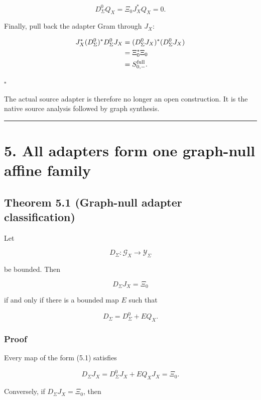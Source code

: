 \[
D_\Sigma^0Q_X
=
\Xi_0J_X^*Q_X
=
0.
\]

Finally, pull back the adapter Gram through \(J_X\):

\[
\begin{aligned}
J_X^*(D_\Sigma^0)^*D_\Sigma^0J_X
&=
(D_\Sigma^0J_X)^*(D_\Sigma^0J_X)\\
&=
\Xi_0^*\Xi_0\\
&=
S_{0,-}^{\rm full}.
\end{aligned}
\]

\(\square\)

The actual source adapter is therefore no longer an open construction. It is
the native source analysis followed by graph synthesis.

\begin{center}\rule{0.5\linewidth}{0.5pt}\end{center}

\hypertarget{all-adapters-form-one-graph-null-affine-family}{%
\section{5. All adapters form one graph-null affine family}\label{all-adapters-form-one-graph-null-affine-family}}

\hypertarget{theorem-5.1-graph-null-adapter-classification}{%
\subsection{Theorem 5.1 (Graph-null adapter classification)}\label{theorem-5.1-graph-null-adapter-classification}}

Let

\[
D_\Sigma:\mathcal G_X\to\mathcal Y_\Sigma
\]

be bounded. Then

\[
D_\Sigma J_X=\Xi_0
\]

if and only if there is a bounded map \(E\) such that

\[
\boxed{
D_\Sigma
=
D_\Sigma^0+EQ_X.
}
\tag{5.1}
\]

\hypertarget{proof-1}{%
\subsubsection{Proof}\label{proof-1}}

Every map of the form (5.1) satisfies

\[
D_\Sigma J_X
=
D_\Sigma^0J_X+EQ_XJ_X
=
\Xi_0.
\]

Conversely, if \(D_\Sigma J_X=\Xi_0\), then

